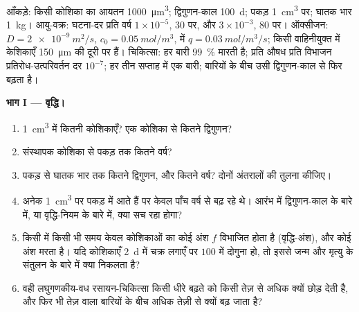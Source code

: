 \begin{problem}
\label{pb:b3:cancer-biology:1}
आँकड़े: किसी  कोशिका का आयतन \qty{1000}{\micro m^3}; द्विगुणन-काल
\qty{100}{d}; पकड़ \qty{1}{cm^3} पर; घातक भार \qty{1}{kg}।
आयु-वक्र: घटना-दर प्रति वर्ष $1\times 10^{-5}$, $30$ पर, और $3\times
10^{-3}$, $80$ पर। ऑक्सीजन: $D = \qty{2e-9}{m^2/s}$, $c_{0} =
\qty{0.05}{mol/m^3}$,  में $q = \qty{0.03}{mol/m^3/s}$; किसी
वाहिनीयुक्त  में केशिकाएँ \qty{150}{\micro m} की दूरी पर हैं।
चिकित्सा: हर बारी \qty{99}{\%} मारती है; प्रति औषध प्रति विभाजन
प्रतिरोध-उत्परिवर्तन दर $10^{-7}$; हर तीन सप्ताह में एक बारी; 
बारियों के बीच उसी द्विगुणन-काल से फिर बढ़ता है।

\medskip
\noindent\textbf{भाग I --- वृद्धि।}
\begin{enumerate}
  \item \qty{1}{cm^3} में कितनी कोशिकाएँ? एक कोशिका से कितने
        द्विगुणन?
  \item संस्थापक कोशिका से पकड़ तक कितने वर्ष?
  \item पकड़ से घातक भार तक कितने द्विगुणन, और कितने वर्ष? दोनों
        अंतरालों की तुलना कीजिए।
  \item अनेक  \qty{1}{cm^3} पर पकड़ में आते हैं पर केवल पाँच
        वर्ष से बढ़ रहे थे। आरंभ में द्विगुणन-काल के बारे में, या
        वृद्धि-नियम के बारे में, क्या सच रहा होगा?
  \item किसी  में किसी भी समय केवल कोशिकाओं का कोई अंश $f$
        विभाजित होता है (वृद्धि-अंश), और कोई अंश मरता है। यदि कोशिकाएँ
        \qty{2}{d} में चक्र लगाएँ पर  $100$ में दोगुना हो, तो
        इससे जन्म और मृत्यु के संतुलन के बारे में क्या निकलता है?
  \item वही लघुगणकीय-वध रसायन-चिकित्सा किसी धीरे बढ़ते  को किसी
        तेज़  से अधिक क्यों छोड़ देती है, और फिर भी तेज़ वाला
        बारियों के बीच अधिक तेज़ी से क्यों बढ़ जाता है?
\end{enumerate}


\end{problem}
